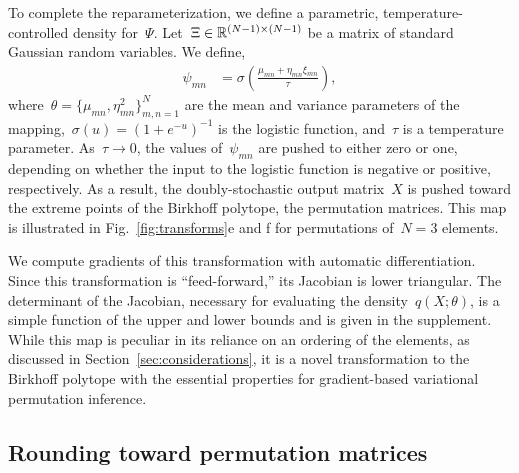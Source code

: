 \documentclass[twoside]{article}
\begin{document}
To complete the reparameterization, we define a parametric,
temperature-controlled density for~$\Psi$.
Let~${\Xi \in \mathbb{R}^{(N-1) \times (N-1)}}$ be a matrix of standard
Gaussian random variables.  We
define,
\begin{align*}
  \psi_{mn} &= \sigma\left( \frac{\mu_{mn} + \eta_{mn} \xi_{mn}}{\tau} \right),
\end{align*}
where~${\theta = \{\mu_{mn}, \eta^2_{mn}\}_{m,n=1}^N}$ are the mean
and variance parameters of the
mapping,~${\sigma(u) = (1+e^{-u})^{-1}}$ is the logistic function,
and~$\tau$ is a temperature parameter. As~$\tau \to 0$, the values
of~$\psi_{mn}$ are pushed to either zero or one, depending on whether
the input to the logistic function is negative or positive,
respectively.  As a result, the doubly-stochastic output matrix~$X$ is
pushed toward the extreme points of the Birkhoff polytope, the
permutation matrices.  This map is illustrated in
Fig.~\ref{fig:transforms}e and f for permutations of~${N=3}$
elements.

We compute gradients of this transformation with automatic
differentiation.  Since this transformation is ``feed-forward,'' its
Jacobian is lower triangular. The determinant of the Jacobian, necessary for evaluating the density~$q(X; \theta)$, is a simple function of the upper and lower bounds and is given in the supplement.
While this map is peculiar in its reliance on an ordering of the
elements, as discussed in Section~\ref{sec:considerations}, it is a
novel transformation to the Birkhoff polytope with the essential
properties for gradient-based variational permutation inference.

\subsection{Rounding toward permutation matrices}
\label{sub:rounding}
\end{document}
